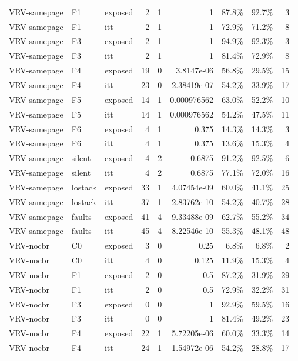 \begin{tabular}{lllrrrrrr}
VRV-samepage & F1 & exposed & 2 & 1 & 1 & 87.8\% & 92.7\% & 3 \\
VRV-samepage & F1 & itt & 2 & 1 & 1 & 72.9\% & 71.2\% & 8 \\
VRV-samepage & F3 & exposed & 2 & 1 & 1 & 94.9\% & 92.3\% & 3 \\
VRV-samepage & F3 & itt & 2 & 1 & 1 & 81.4\% & 72.9\% & 8 \\
VRV-samepage & F4 & exposed & 19 & 0 & 3.8147e-06 & 56.8\% & 29.5\% & 15 \\
VRV-samepage & F4 & itt & 23 & 0 & 2.38419e-07 & 54.2\% & 33.9\% & 17 \\
VRV-samepage & F5 & exposed & 14 & 1 & 0.000976562 & 63.0\% & 52.2\% & 10 \\
VRV-samepage & F5 & itt & 14 & 1 & 0.000976562 & 54.2\% & 47.5\% & 11 \\
VRV-samepage & F6 & exposed & 4 & 1 & 0.375 & 14.3\% & 14.3\% & 3 \\
VRV-samepage & F6 & itt & 4 & 1 & 0.375 & 13.6\% & 15.3\% & 4 \\
VRV-samepage & silent & exposed & 4 & 2 & 0.6875 & 91.2\% & 92.5\% & 6 \\
VRV-samepage & silent & itt & 4 & 2 & 0.6875 & 77.1\% & 72.0\% & 16 \\
VRV-samepage & lostack & exposed & 33 & 1 & 4.07454e-09 & 60.0\% & 41.1\% & 25 \\
VRV-samepage & lostack & itt & 37 & 1 & 2.83762e-10 & 54.2\% & 40.7\% & 28 \\
VRV-samepage & faults & exposed & 41 & 4 & 9.33488e-09 & 62.7\% & 55.2\% & 34 \\
VRV-samepage & faults & itt & 45 & 4 & 8.22546e-10 & 55.3\% & 48.1\% & 48 \\
VRV-nocbr & C0 & exposed & 3 & 0 & 0.25 & 6.8\% & 6.8\% & 2 \\
VRV-nocbr & C0 & itt & 4 & 0 & 0.125 & 11.9\% & 15.3\% & 4 \\
VRV-nocbr & F1 & exposed & 2 & 0 & 0.5 & 87.2\% & 31.9\% & 29 \\
VRV-nocbr & F1 & itt & 2 & 0 & 0.5 & 72.9\% & 32.2\% & 31 \\
VRV-nocbr & F3 & exposed & 0 & 0 & 1 & 92.9\% & 59.5\% & 16 \\
VRV-nocbr & F3 & itt & 0 & 0 & 1 & 81.4\% & 49.2\% & 23 \\
VRV-nocbr & F4 & exposed & 22 & 1 & 5.72205e-06 & 60.0\% & 33.3\% & 14 \\
VRV-nocbr & F4 & itt & 24 & 1 & 1.54972e-06 & 54.2\% & 28.8\% & 17 \\

\end{tabular}
